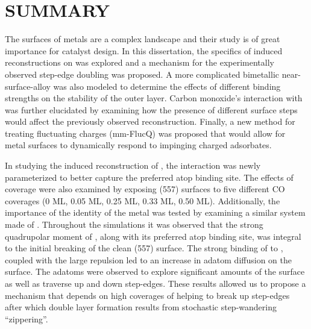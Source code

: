\chapter{SUMMARY}
\label{chap:summary}

The surfaces of metals are a complex landscape and their study is of great
importance for catalyst design. In this dissertation, the specifics of 
induced reconstructions on  was explored and a mechanism for the
experimentally observed step-edge doubling was proposed. A more complicated
bimetallic  near-surface-alloy was also modeled to determine
the effects of different binding strengths on the stability of the outer
 layer.  Carbon monoxide's interaction with  was further
elucidated by examining how the presence of different surface steps would
affect the previously observed reconstruction. Finally, a new method for
treating fluctuating charges (mm-FlucQ) was proposed that would allow for metal
surfaces to dynamically respond to impinging charged adsorbates.

In studying the induced reconstruction of , the 
interaction was newly parameterized to better capture the preferred atop
binding site. The effects of coverage were also examined by exposing (557)
 surfaces to five different CO coverages (0 ML, 0.05 ML, 0.25 ML, 0.33
ML, 0.50 ML).  Additionally, the importance of the identity of the metal was
tested by examining a similar system made of . Throughout the
simulations it was observed that the strong quadrupolar moment of ,
along with its preferred atop binding site, was integral to the initial
breaking of the clean (557) surface. The strong binding of  to ,
coupled with the large  repulsion led to an increase in
 adatom diffusion on the surface. The adatoms were observed to explore
significant amounts of the surface as well as traverse up and down step-edges.
These results allowed us to propose a mechanism that depends on high coverages
of  helping to break up step-edges after which double layer formation
results from stochastic step-wandering ``zippering''.

